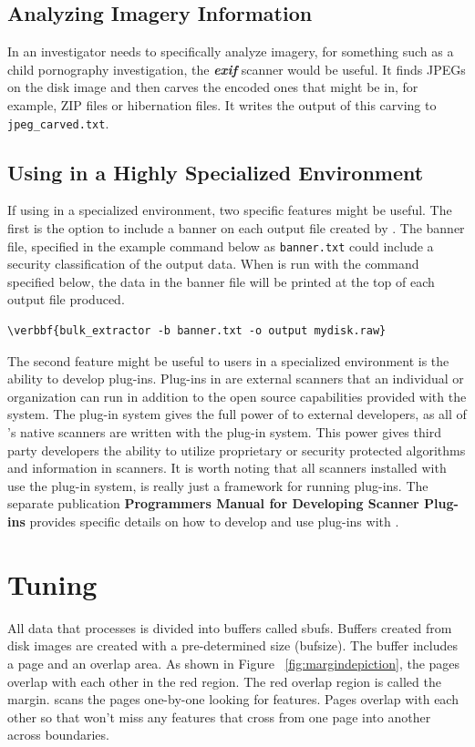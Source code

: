 \documentclass[11pt]{article} %
\begin{document}
\subsection{Analyzing Imagery Information}
\label{imagery}
In an investigator needs to specifically analyze imagery, for something such as a child pornography investigation, the \textbf{\textit{exif}} scanner would be useful. It finds JPEGs on the disk image and then carves the encoded ones that might be in, for example, ZIP files or hibernation files. It writes the output of this carving to \texttt{jpeg_carved.txt}.

\subsection{Using \bulk in a Highly Specialized Environment}
If using \bulk in a specialized environment, two specific features might be useful.  The first is the option to include a banner on each output file created by \bulk. The banner file, specified in the example command below as \texttt{banner.txt} could include a security classification of the output data. When \bulk is run with the command specified below, the data in the banner file will be printed at the top of each output file produced.
\begin{Verbatim}[commandchars=\\\{\}]
\verbbf{bulk_extractor -b banner.txt -o output mydisk.raw}
\end{Verbatim}

The second feature might be useful to users in a specialized environment is the ability to develop plug-ins. Plug-ins in \bulk are external scanners that an individual or organization can run in addition to the open source capabilities provided with the \bulk system. The plug-in system gives the full power of \bulk to external developers, as all of \bulk's native scanners are written with the plug-in system. This power gives third party developers the ability to utilize proprietary or security protected algorithms and information in \bulk scanners. It is worth noting that all scanners installed with \bulk use the plug-in system, \bulk is really just a framework for running plug-ins.  The separate publication \textbf{Programmers Manual for Developing Scanner Plug-ins} \cite{programmersmanual} provides specific details on how to develop and use plug-ins with \bulk.

\section{Tuning \bulk}
All data that \bulk processes is divided into buffers called sbufs. Buffers created from disk images are created with a pre-determined size (bufsize). The buffer includes a page and an overlap area. As shown in Figure ~\ref{fig:margindepiction}, the pages overlap with each other in the red region. The red overlap region is called the margin. \bulk scans the pages one-by-one looking for features. Pages overlap with each other so that \bulk won't miss any features that cross from one page into another across boundaries.\\
\end{document}
